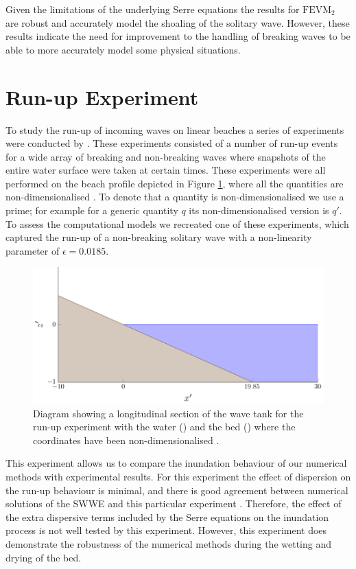Given the limitations of the underlying Serre equations the results for $\text{FEVM}_2$ are robust and accurately model the shoaling of the solitary wave. However, these results indicate the need for improvement to the handling of breaking waves to be able to more accurately model some physical situations. 

\section{Run-up Experiment}
To study the run-up of incoming waves on linear beaches a series of experiments were conducted by \citet{Synolakis-1987-523}. These experiments consisted of a number of run-up events for a wide array of breaking and non-breaking waves where snapshots of the entire water surface were taken at certain times. These experiments were all performed on the beach profile depicted in Figure \ref{fig:SynolakisWT}, where all the quantities are non-dimensionalised \cite{Synolakis-1987-523}. To denote that a quantity is non-dimensionalised we use a prime; for example for a generic quantity $q$ its non-dimensionalised version is $q'$. To assess the computational models we recreated one of these experiments, which captured the run-up of a non-breaking solitary wave with a non-linearity parameter of $\epsilon = 0.0185$.
\begin{figure}
	\centering
	\includegraphics[width=\textwidth]{./chp6/figures/Experiment/Synolakis/WavetankArtifical.pdf}
	\caption{Diagram showing a longitudinal section of the wave tank for the run-up experiment with the water () and the bed () where the coordinates have been non-dimensionalised \cite{Synolakis-1987-523}.}
	\label{fig:SynolakisWT}
\end{figure}

This experiment allows us to compare the inundation behaviour of our numerical methods with experimental results. For this experiment the effect of dispersion on the run-up behaviour is minimal, and there is good agreement between numerical solutions of the SWWE and this particular experiment \cite{Bollermann-etal-2011-271}. Therefore, the effect of the extra dispersive terms included by the Serre equations on the inundation process is not well tested by this experiment. However, this experiment does demonstrate the robustness of the numerical methods during the wetting and drying of the bed. 

